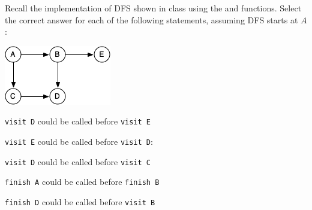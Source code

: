 \begin{problem}

Recall the implementation of DFS shown in class using the 
and  functions. Select the correct answer for each of the
following statements, assuming DFS starts at $A$:

\begin{center}
  \includegraphics[scale=.7]{quiz/media/dfs-graph1.jpg}
\end{center}

\asktf
\texttt{visit D} could be called before \texttt{visit E}

\solt


\asktf
\texttt{visit E} could be called before \texttt{visit D}:
\solt

\asktf
\texttt{visit D} could be called before \texttt{visit C}
\solt

\asktf 
\texttt{finish A} could be called before \texttt{finish B}
\solf

\asktf
\texttt{finish D} could be called before \texttt{visit B}
\solt

\end{problem}
